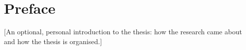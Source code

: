 \chapter*{Preface}

[An optional, personal introduction to the thesis: how the research came about and how the thesis is organised.]

\lipsum[1-2]
